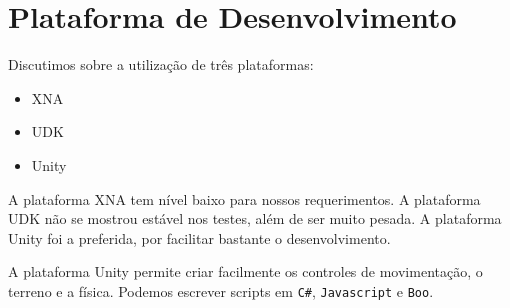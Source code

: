 \documentclass[letterpaper,11pt]{article}
\begin{document}
\section{Plataforma de Desenvolvimento}
 Discutimos sobre a utilização de três plataformas:
 \begin{itemize}
  \item XNA
  \item UDK
  \item Unity
 \end{itemize}
 A plataforma XNA tem nível baixo para nossos requerimentos. 
A plataforma UDK não se mostrou estável nos testes, além de ser muito pesada. 
A plataforma Unity foi a preferida, por facilitar bastante o desenvolvimento.

A plataforma Unity permite criar facilmente os controles de movimentação, o terreno e a física. Podemos escrever scripts em \verb+C#+, \verb+Javascript+ e \verb+Boo+.
\end{document}
